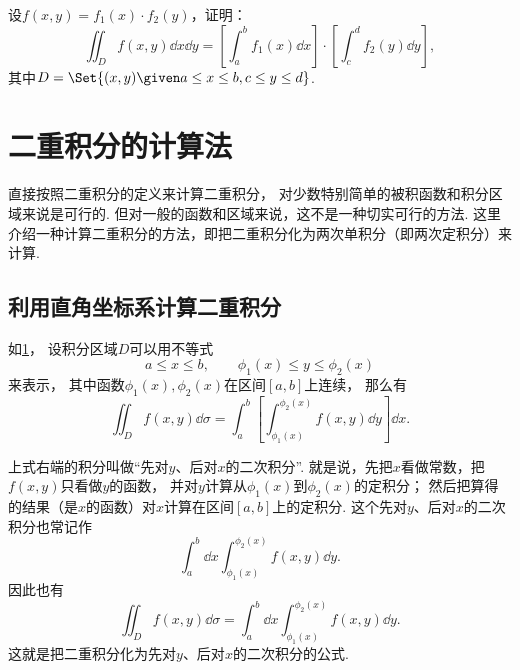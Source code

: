 \begin{example}
设\(f(x,y) = f_1(x) \cdot f_2(y)\)，证明：\[
	\iint_D f(x,y) \dd{x} \dd{y}
	= \left[ \int_a^b f_1(x) \dd{x} \right] \cdot \left[ \int_c^d f_2(y) \dd{y} \right],
\]
其中\(D = \Set{(x,y) \given a \leq x \leq b, c \leq y \leq d}\).
\end{example}

\section{二重积分的计算法}
直接按照二重积分的定义来计算二重积分，
对少数特别简单的被积函数和积分区域来说是可行的.
但对一般的函数和区域来说，这不是一种切实可行的方法.
这里介绍一种计算二重积分的方法，即把二重积分化为两次单积分（即两次定积分）来计算.

\subsection{利用直角坐标系计算二重积分}
如\cref{figure:二重积分.X型区域}，
设积分区域\(D\)可以用不等式
\[
	a \leq x \leq b, \qquad
	\phi_1(x) \leq y \leq \phi_2(x)
\]来表示，
其中函数\(\phi_1(x),\phi_2(x)\)在区间\([a,b]\)上连续，
那么有\[
	\iint_D f(x,y) \dd\sigma
	= \int_a^b \left[ \int_{\phi_1(x)}^{\phi_2(x)} f(x,y) \dd{y} \right] \dd{x}.
\]

上式右端的积分叫做“先对\(y\)、后对\(x\)的二次积分”.
就是说，先把\(x\)看做常数，把\(f(x,y)\)只看做\(y\)的函数，
并对\(y\)计算从\(\phi_1(x)\)到\(\phi_2(x)\)的定积分；
然后把算得的结果（是\(x\)的函数）对\(x\)计算在区间\([a,b]\)上的定积分.
这个先对\(y\)、后对\(x\)的二次积分也常记作\[
	\int_a^b \dd{x} \int_{\phi_1(x)}^{\phi_2(x)} f(x,y) \dd{y}.
\]
因此也有\[
	\iint_D f(x,y) \dd\sigma
	= \int_a^b \dd{x} \int_{\phi_1(x)}^{\phi_2(x)} f(x,y) \dd{y}.
\]
这就是把二重积分化为先对\(y\)、后对\(x\)的二次积分的公式.

\begin{figure}[htb]
	\centering
	\caption{}
	\label{figure:二重积分.X型区域}
\end{figure}

